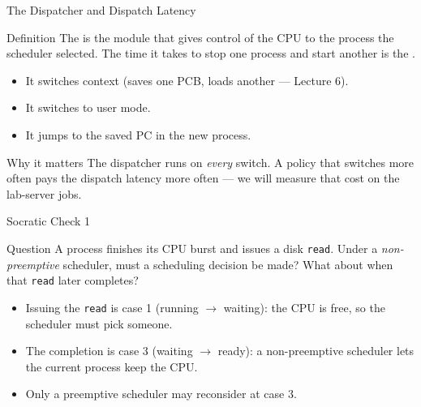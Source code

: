 \documentclass[aspectratio=169]{beamer}
\begin{document}
\begin{frame}{The Dispatcher and Dispatch Latency}
  \begin{block}{Definition}
    The  is the module that gives control of the CPU to the
    process the scheduler selected. The time it takes to stop one process and
    start another is the .
  \end{block}
  \begin{itemize}
    \item It switches context (saves one PCB, loads another --- Lecture 6).
    \item It switches to user mode.
    \item It jumps to the saved PC in the new process.
  \end{itemize}
  \vspace{0.1cm}
  \begin{exampleblock}{Why it matters}
    The dispatcher runs on \emph{every} switch. A policy that switches more
    often pays the dispatch latency more often --- we will measure that cost
    on the lab-server jobs.
  \end{exampleblock}
\end{frame}

\begin{frame}{Socratic Check 1}
  \begin{block}{Question}
    A process finishes its CPU burst and issues a disk \texttt{read}. Under a
    \emph{non-preemptive} scheduler, must a scheduling decision be made? What
    about when that \texttt{read} later completes?
  \end{block}
  \vspace{0.25cm}
  \begin{itemize}
    \item Issuing the \texttt{read} is case 1 (running $\to$ waiting): the CPU
      is free, so the scheduler must pick someone.
    \item The completion is case 3 (waiting $\to$ ready): a non-preemptive
      scheduler lets the current process keep the CPU.
    \item Only a preemptive scheduler may reconsider at case 3.
  \end{itemize}
\end{frame}


\end{document}

